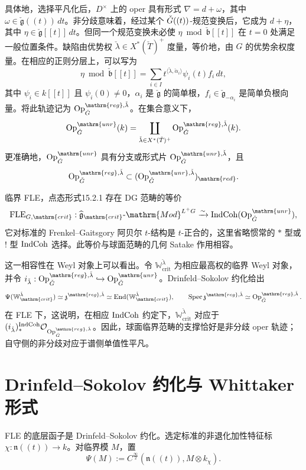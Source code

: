具体地，选择平凡化后，$D^\times$ 上的 oper 具有形式 $\nabla=d+\omega$，其中 $\omega\in\check{\mathfrak g}((t))\,dt$。非分歧意味着，经过某个 $\check{G}((t))$-规范变换后，它成为 $d+\eta$，其中 $\eta\in\check{\mathfrak g}[[t]]\,dt$。但同一个规范变换未必使 $\eta\bmod\check{\mathfrak b}[[t]]$ 在 $t=0$ 处满足一般位置条件。缺陷由优势权 $\check\lambda\in X^*(\check T)^+$ 度量，等价地，由 $G$ 的优势余权度量。在相应的正则分层上，可以写为
\[\eta\bmod\check{\mathfrak b}[[t]]=\sum_{i\in I}t^{\langle\check\lambda,\check\alpha_i\rangle}\psi_i(t)f_i\,dt,\]
其中 $\psi_i\in k[[t]]$ 且 $\psi_i(0)\ne0$，$\alpha_i$ 是 $\check{\mathfrak g}$ 的简单根，$f_i\in\check{\mathfrak g}_{-\alpha_i}$ 是简单负根向量。将此轨迹记为 $\Op^{\mathrm{reg},\check\lambda}_{\checkG}$。在集合意义下，
\[\Op^{\mathrm{unr}}_{\checkG}(k)=\coprod_{\check\lambda\in X^*(\check T)^+}\Op^{\mathrm{reg},\check\lambda}_{\checkG}(k).\]
更准确地，$\Op^{\mathrm{unr}}_{\checkG}$ 具有分支或形式片 $\Op^{\mathrm{unr},\check\lambda}_{\checkG}$，且
\[\Op^{\mathrm{reg},\check\lambda}_{\checkG}\subset(\Op^{\mathrm{unr},\check\lambda}_{\checkG})_{\mathrm{red}}.\]
\begin{theorem}{临界 FLE，点态形式\cite{FG07,ABC24a}}{15.2.1}
存在 DG 范畴的等价
\[\operatorname{FLE}_{G,\mathrm{crit}}:\widehat{\mathfrak g}_{\mathrm{crit}}\text{-}\mathrm{Mod}^{L^+G}\xrightarrow{\sim}\IndCoh(\Op^{\mathrm{unr}}_{\checkG}),\]
它对标准的 Frenkel–Gaitsgory 阿贝尔 $t$-结构是 $t$-正合的，这里省略惯常的 $*$ 型或 $!$ 型 $\operatorname{IndCoh}$ 选择。此等价与球面范畴的几何 Satake 作用相容。
\end{theorem}

这一相容性在 Weyl 对象上可以看出。令 $\mathbb W^{\check\lambda}_{\mathrm{crit}}$ 为相应最高权的临界 Weyl 对象，并令 $i_{\check\lambda}:\Op^{\mathrm{reg},\check\lambda}_{\checkG}\hookrightarrow\Op^{\mathrm{unr}}_{\checkG}$。Drinfeld–Sokolov 约化给出
\[\Psi(\mathbb W^{\check\lambda}_{\mathrm{crit}})\simeq\mathfrak z^{\mathrm{reg},\check\lambda}\simeq\End(\mathbb W^{\check\lambda}_{\mathrm{crit}}),\qquad
\Spec\mathfrak z^{\mathrm{reg},\check\lambda}\simeq\Op^{\mathrm{reg},\check\lambda}_{\checkG}.\]
在 FLE 下，这说明，在相应 $\operatorname{IndCoh}$ 约定下，$\mathbb W^{\check\lambda}_{\mathrm{crit}}$ 对应于 $(i_{\check\lambda})_*^{\IndCoh}\cO_{\Op^{\mathrm{reg},\check\lambda}_{\checkG}}$。因此，球面临界范畴的支撑恰好是非分歧 oper 轨迹；自守侧的非分歧对应于谱侧单值性平凡。

\section{Drinfeld–Sokolov 约化与 Whittaker 形式}\label{sec:15.3}
FLE 的底层函子是 Drinfeld–Sokolov 约化\cite{FG05,Fre02}。选定标准的非退化加性特征标 $\chi:\mathfrak n((t))\to k$。对临界模 $M$，置
\[\Psi(M):=C^{\frac\infty2}(\mathfrak n((t)),M\otimes k_\chi).\]

